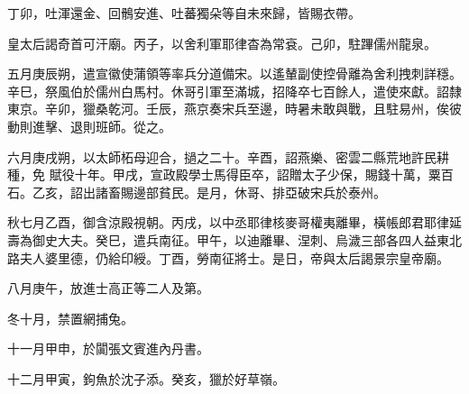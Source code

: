 \begin{pinyinscope}
 丁卯，吐渾還金、回鶻安進、吐蕃獨朵等自未來歸，皆賜衣帶。



 皇太后謁奇首可汗廟。丙子，以舍利軍耶律杳為常袞。己卯，駐蹕儒州龍泉。



 五月庚辰朔，遣宣徽使蒲領等率兵分道備宋。以遙輦副使控骨離為舍利拽刺詳穩。辛巳，祭風伯於儒州白馬村。休哥引軍至滿城，招降卒七百餘人，遣使來獻。詔隸東京。辛卯，獵桑乾河。壬辰，燕京奏宋兵至邊，時暑未敢與戰，且駐易州，俟彼動則進擊、退則班師。從之。



 六月庚戌朔，以太師柘母迎合，撾之二十。辛酉，詔燕樂、密雲二縣荒地許民耕種，免
 賦役十年。甲戌，宣政殿學士馬得臣卒，詔贈太子少保，賜錢十萬，粟百石。乙亥，詔出諸畜賜邊部貧民。是月，休哥、排亞破宋兵於泰州。



 秋七月乙酉，御含涼殿視朝。丙戌，以中丞耶律核麥哥權夷離畢，橫帳郎君耶律延壽為御史大夫。癸巳，遣兵南征。甲午，以迪離畢、涅刺、烏濊三部各四人益東北路夫人婆里德，仍給印綬。丁酉，勞南征將士。是日，帝與太后謁景宗皇帝廟。



 八月庚午，放進士高正等二人及第。



 冬十月，禁置網捕兔。



 十一月甲申，於闐張文賓進內丹書。



 十二月甲寅，鉤魚於沈子添。癸亥，獵於好草嶺。



\end{pinyinscope}